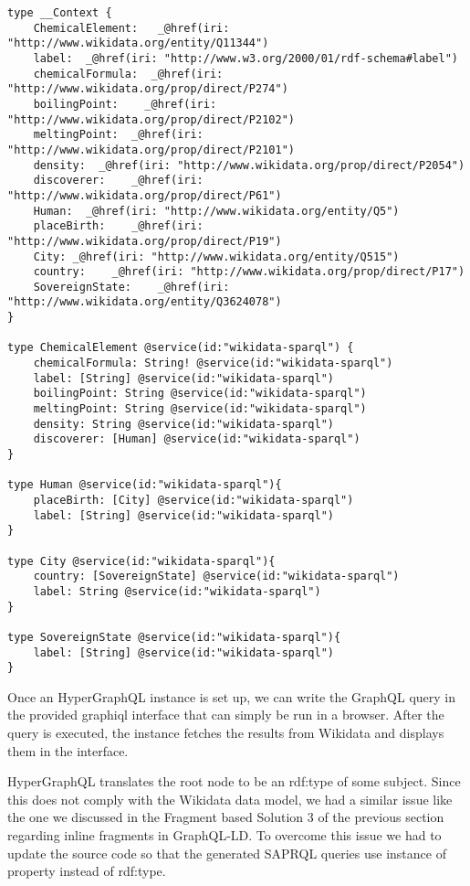 \begin{minipage}{\linewidth}
\begin{lstlisting}[label=listing:listing31, caption={Schema}]
type __Context {
    ChemicalElement:   _@href(iri: "http://www.wikidata.org/entity/Q11344")
    label:  _@href(iri: "http://www.w3.org/2000/01/rdf-schema#label")
    chemicalFormula:  _@href(iri: "http://www.wikidata.org/prop/direct/P274")
    boilingPoint:    _@href(iri: "http://www.wikidata.org/prop/direct/P2102")
    meltingPoint:  _@href(iri: "http://www.wikidata.org/prop/direct/P2101")
    density:  _@href(iri: "http://www.wikidata.org/prop/direct/P2054")
    discoverer:    _@href(iri: "http://www.wikidata.org/prop/direct/P61")
    Human:  _@href(iri: "http://www.wikidata.org/entity/Q5")
    placeBirth:    _@href(iri: "http://www.wikidata.org/prop/direct/P19")
    City: _@href(iri: "http://www.wikidata.org/entity/Q515")
    country:    _@href(iri: "http://www.wikidata.org/prop/direct/P17")
    SovereignState:    _@href(iri: "http://www.wikidata.org/entity/Q3624078")
}

type ChemicalElement @service(id:"wikidata-sparql") {
    chemicalFormula: String! @service(id:"wikidata-sparql")
    label: [String] @service(id:"wikidata-sparql")
    boilingPoint: String @service(id:"wikidata-sparql")
    meltingPoint: String @service(id:"wikidata-sparql")
    density: String @service(id:"wikidata-sparql")
    discoverer: [Human] @service(id:"wikidata-sparql")
}

type Human @service(id:"wikidata-sparql"){
    placeBirth: [City] @service(id:"wikidata-sparql")
    label: [String] @service(id:"wikidata-sparql")
}

type City @service(id:"wikidata-sparql"){
    country: [SovereignState] @service(id:"wikidata-sparql")
    label: String @service(id:"wikidata-sparql")
}

type SovereignState @service(id:"wikidata-sparql"){
    label: [String] @service(id:"wikidata-sparql")
}
\end{lstlisting}
\end{minipage}

Once an HyperGraphQL instance is set up, we can write the GraphQL query in the provided graphiql interface that can simply be run in a browser. After the query is executed, the instance fetches the results from Wikidata and displays them in the interface. 

HyperGraphQL translates the root node to be an rdf:type of some subject. Since this does not comply with the Wikidata data model, we had a similar issue like the one we discussed in the Fragment based Solution 3 of the previous section regarding inline fragments in GraphQL-LD. To overcome this issue we had to update the source code so that the generated SAPRQL queries use instance of property instead of rdf:type.

